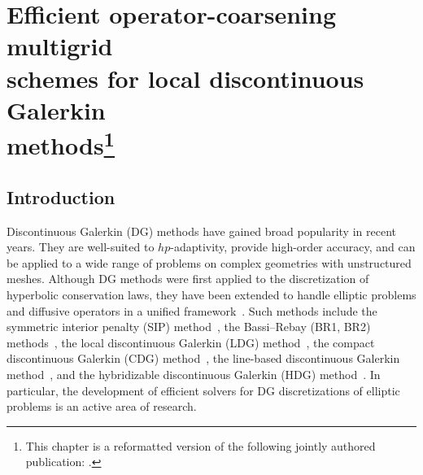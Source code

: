 \graphicspath{{chapters/\chap/figures/}{chapters/\chap/figures/interface/}}
\makeatletter
{}
\makeatother

\setcounter{savefootnote}{\value{footnote}} %
\renewcommand*{\thefootnote}{\fnsymbol{footnote}}

\chapter[Efficient operator-coarsening multigrid schemes for local discontinuous Galerkin methods]{Efficient operator-coarsening multigrid \\ schemes for local discontinuous Galerkin \\ methods\protect\footnote[2]{This chapter is a reformatted version of the following jointly authored publication: .}}\label{sec:\chap}

\renewcommand*{\thefootnote}{\arabic{footnote}}
\setcounter{footnote}{\value{savefootnote}} %

\section{Introduction}

Discontinuous Galerkin (DG) methods have gained broad popularity in recent years. They are well-suited to $hp$-adaptivity, provide high-order accuracy, and can be applied to a wide range of problems on complex geometries with unstructured meshes. Although DG methods were first applied to the discretization of hyperbolic conservation laws, they have been extended to handle elliptic problems and diffusive operators in a unified framework~\cite{Arnold_02_01}. Such methods include the symmetric interior penalty (SIP) method~\cite{Douglas_76_01, Arnold_82_01}, the Bassi--Rebay (BR1, BR2) methods~\cite{Bassi_97_01, Bassi_97_02}, the local discontinuous Galerkin (LDG) method~\cite{Cockburn_98_01}, the compact discontinuous Galerkin (CDG) method~\cite{Peraire_08_01}, the line-based discontinuous Galerkin method~\cite{Persson_13_01}, and the hybridizable discontinuous Galerkin (HDG) method~\cite{Cockburn_09_01}. In particular, the development of efficient solvers for DG discretizations of elliptic problems is an active area of research.

